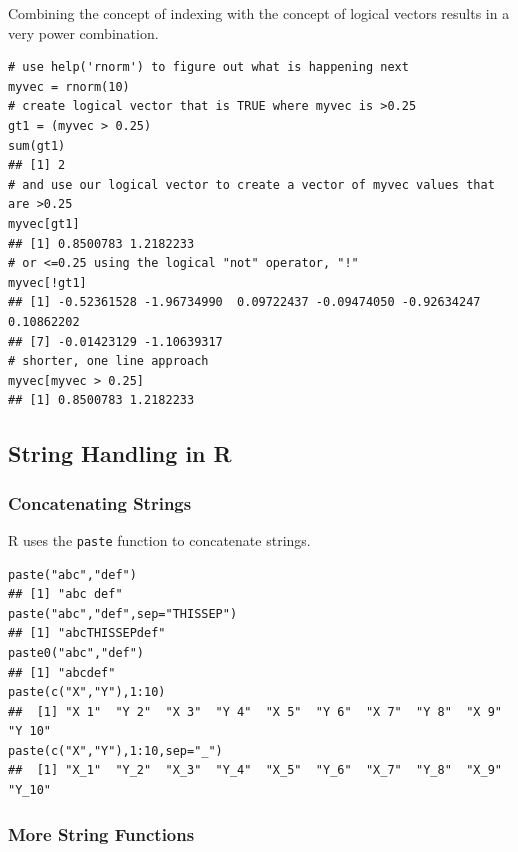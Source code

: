 \documentclass[]{article}
\theoremstyle{definition}
\theoremstyle{definition}
\theoremstyle{remark}
\begin{document}
Combining the concept of indexing with the concept of logical vectors
results in a very power combination.

\begin{verbatim}
# use help('rnorm') to figure out what is happening next
myvec = rnorm(10)
# create logical vector that is TRUE where myvec is >0.25
gt1 = (myvec > 0.25)
sum(gt1)
## [1] 2
# and use our logical vector to create a vector of myvec values that are >0.25
myvec[gt1]
## [1] 0.8500783 1.2182233
# or <=0.25 using the logical "not" operator, "!"
myvec[!gt1]
## [1] -0.52361528 -1.96734990  0.09722437 -0.09474050 -0.92634247  0.10862202
## [7] -0.01423129 -1.10639317
# shorter, one line approach
myvec[myvec > 0.25]
## [1] 0.8500783 1.2182233
\end{verbatim}

\subsection{String Handling in R}\label{string-handling-in-r}

\subsubsection{Concatenating Strings}\label{concatenating-strings}

R uses the \texttt{paste} function to concatenate strings.

\begin{verbatim}
paste("abc","def")
## [1] "abc def"
paste("abc","def",sep="THISSEP")
## [1] "abcTHISSEPdef"
paste0("abc","def")
## [1] "abcdef"
paste(c("X","Y"),1:10)
##  [1] "X 1"  "Y 2"  "X 3"  "Y 4"  "X 5"  "Y 6"  "X 7"  "Y 8"  "X 9"  "Y 10"
paste(c("X","Y"),1:10,sep="_")
##  [1] "X_1"  "Y_2"  "X_3"  "Y_4"  "X_5"  "Y_6"  "X_7"  "Y_8"  "X_9"  "Y_10"
\end{verbatim}

\subsubsection{More String Functions}\label{more-string-functions}
\end{document}

